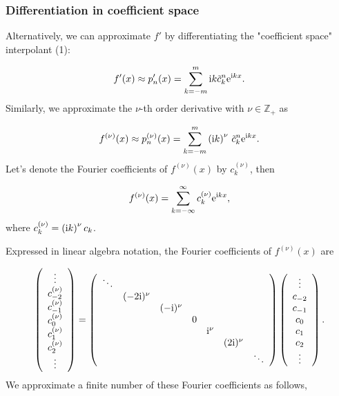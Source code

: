 \documentclass[12pt,landscape]{article}
\begin{document}
{\subsubsection{Differentiation in coefficient space}
Alternatively, we can approximate $f'$ by differentiating the "coefficient space" interpolant (1):

\[
f'(x) \approx p_n'(x) = \sum_{k=-m}^{m} {\rm i }k\tilde{c}^n_k{\rm e}^{{\rm i}kx}.
\]
Similarly, we approximate the $\nu$-th order derivative with $\nu \in \mathbb{Z}_+$ as

\[
f^{(\nu)}(x) \approx p^{(\nu)}_n(x) = \sum_{k=-m}^{m} \left({\rm i }k\right)^{\nu}\,\tilde{c}^n_k{\rm e}^{{\rm i}kx}.
\]
Let's denote the Fourier coefficients of $f^{(\nu)}(x)$ by $c_k^{(\nu)}$, then

\[
f^{(\nu)}(x) = \sum_{k=-\infty}^{\infty}c_k^{(\nu)}{\rm e}^{{\rm i}kx},
\]
where $c_k^{(\nu)} =  \left( {\rm i}k \right)^{\nu} c_k$.  

Expressed in linear algebra notation, the Fourier coefficients of $f^{(\nu)}(x)$ are

\[
\left(\begin{array}{c}
\vdots \\
c_{-2}^{(\nu)}\\
c_{-1}^{(\nu)}\\
c_0^{(\nu)}\\
c_1^{(\nu)}\\
c_2^{(\nu)}\\
\vdots
\end{array}
\right)
= 
\left(
\begin{array}{c c c c c c c}
\ddots & & &  & & & \\
 & (-2{\rm i})^{\nu} & & & & & \\
  &  & (-{\rm i})^{\nu} & & & &  \\
  &  &  & 0 & & &  \\
    &  & & & {\rm i}^{\nu} & &  \\
 & & &     &  & (2{\rm i})^{\nu} &   \\
  & & &     &  & &  \ddots \\
\end{array}
\right)
\left(\begin{array}{c}
\vdots \\
c_{-2}\\
c_{-1}\\
c_0\\
c_1\\
c_2\\
\vdots
\end{array}
\right).
\]
We approximate a finite number of these Fourier coefficients as follows, 

}
\end{document}
